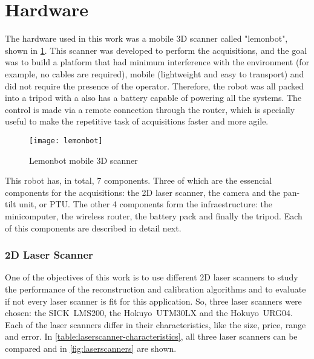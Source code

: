 \section{Hardware}
\label{section:hardware}

The hardware used in this work was a mobile 3D scanner called "lemonbot", shown in \cref{fig:lemonbot}. This scanner was developed to perform the acquisitions, and the goal was to build a platform that had minimum interference with the environment (for example, no cables are required), mobile (lightweight and easy to transport) and did not require the presence of the operator. Therefore, the robot was all packed into a tripod with a also has a battery capable of powering all the systems. The control is made via a remote connection through the router, which is specially useful to make the repetitive task of acquisitions faster and more agile. 

\begin{figure}[p]
    
    \centering
    \texttt{[image: lemonbot]}

    \caption{Lemonbot mobile 3D scanner}
    \label{fig:lemonbot}
\end{figure}

This robot has, in total, 7 components. Three of which are the essencial components for the acquisitions: the 2D laser scanner, the camera and the pan-tilt unit, or PTU. The other 4 components form the infraestructure: the minicomputer, the wireless router, the battery pack and finally the tripod. Each of this components are described in detail next.

\subsubsection{2D Laser Scanner}

One of the objectives of this work is to use different 2D laser scanners to study the performance of the reconstruction and calibration algorithms and to evaluate if not every laser scanner is fit for this application. So, three laser scanners were chosen: the SICK~LMS200, the Hokuyo~UTM30LX and the Hokuyo~URG04. Each of the laser scanners differ in their characteristics, like the size, price, range and error. In \cref{table:laserscanner-characteristics}, all three laser scanners can be compared and in \cref{fig:laserscanners} are shown.

